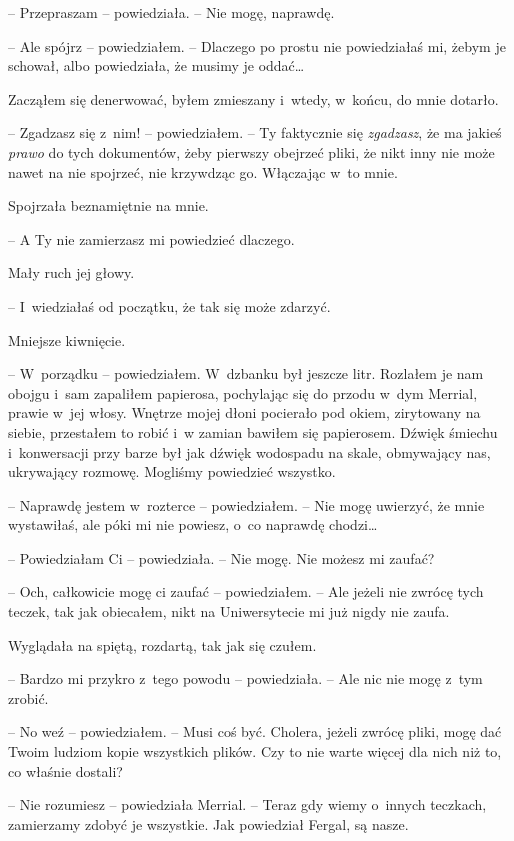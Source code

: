 \documentclass[oneside,polish,11pt,sfheadings]{mwbk}
\begin{document}
-- Przepraszam -- powiedziała. -- Nie mogę, naprawdę.

-- Ale spójrz -- powiedziałem. -- Dlaczego po prostu nie powiedziałaś mi,
żebym je schował, albo powiedziała, że musimy je oddać\ldots

Zacząłem się denerwować, byłem zmieszany i~wtedy, w~końcu, do mnie
dotarło.

-- Zgadzasz się z~nim! -- powiedziałem. -- Ty faktycznie się
\textit{zgadzasz}, że ma jakieś \textit{prawo} do tych dokumentów, żeby
pierwszy obejrzeć pliki, że nikt inny nie może nawet na nie spojrzeć,
nie krzywdząc go. Włączając w~to mnie.

Spojrzała beznamiętnie na mnie.

-- A Ty nie zamierzasz mi powiedzieć dlaczego.

Mały ruch jej głowy.

-- I~wiedziałaś od początku, że tak się może zdarzyć.

Mniejsze kiwnięcie.

-- W~porządku -- powiedziałem. W~dzbanku był jeszcze litr.
Rozlałem je nam obojgu i~sam zapaliłem papierosa, pochylając się do
przodu w~dym Merrial, prawie w~jej włosy. Wnętrze mojej
dłoni pocierało pod okiem, zirytowany na siebie, przestałem to robić i~w zamian bawiłem się papierosem. Dźwięk śmiechu i~konwersacji przy barze
był jak dźwięk wodospadu na skale, obmywający nas, ukrywający rozmowę.
Mogliśmy powiedzieć wszystko.

-- Naprawdę jestem w~rozterce -- powiedziałem. -- Nie mogę uwierzyć, że
mnie wystawiłaś, ale póki mi nie powiesz, o~co naprawdę chodzi\ldots

-- Powiedziałam Ci -- powiedziała. -- Nie mogę. Nie możesz mi zaufać?

-- Och, całkowicie mogę ci zaufać -- powiedziałem. -- Ale jeżeli nie zwrócę
tych teczek, tak jak obiecałem, nikt na Uniwersytecie mi już nigdy nie
zaufa.

Wyglądała na spiętą, rozdartą, tak jak się czułem.

-- Bardzo mi przykro z~tego powodu -- powiedziała. -- Ale nic nie mogę z~tym zrobić.

-- No weź -- powiedziałem. -- Musi coś być. Cholera, jeżeli zwrócę pliki,
mogę dać Twoim ludziom kopie wszystkich plików. Czy to nie warte więcej
dla nich niż to, co właśnie dostali?

-- Nie rozumiesz -- powiedziała Merrial. -- Teraz gdy wiemy o~innych
teczkach, zamierzamy zdobyć je wszystkie. Jak powiedział Fergal, są
nasze.
\end{document}
